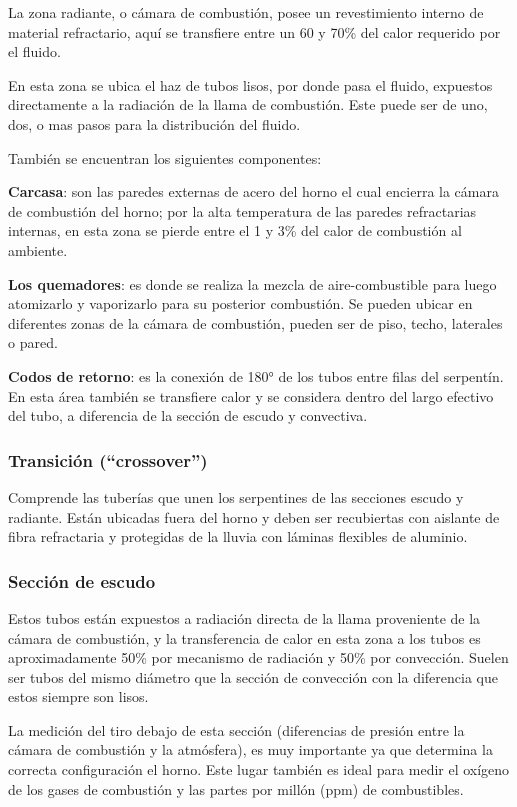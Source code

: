 \par La zona radiante, o cámara de combustión, posee un revestimiento interno de material refractario, aquí se transfiere entre un 60 y 70\% del calor requerido por el fluido.
\par En esta zona se ubica el haz de tubos lisos, por donde pasa el fluido, expuestos directamente a la radiación de la llama de combustión. Este puede ser de uno, dos, o mas pasos para la distribución del fluido.
\par También se encuentran los siguientes componentes:
\par \textbf{Carcasa}: son las paredes externas de acero del horno el cual encierra la cámara de combustión del horno; por la alta temperatura de las paredes refractarias internas, en esta zona se pierde entre el 1 y 3\% del calor de combustión al ambiente.
\par \textbf{Los quemadores}: es donde se realiza la mezcla de aire-combustible para luego atomizarlo y vaporizarlo para su posterior combustión. Se pueden ubicar en diferentes zonas de la cámara de combustión, pueden ser de piso, techo, laterales o pared.
\par \textbf{Codos de retorno}: es la conexión de 180° de los tubos entre filas del serpentín. En esta área también se transfiere calor y se considera dentro del largo efectivo del tubo, a diferencia de la sección de escudo y convectiva.

\subsubsection{Transición (``crossover'')}
\par Comprende las tuberías que unen los serpentines de las secciones escudo y radiante. Están ubicadas fuera del horno y deben ser recubiertas con aislante de fibra refractaria y protegidas de la lluvia con láminas flexibles de aluminio.

\subsubsection{Sección de escudo}
\par Estos tubos están expuestos a radiación directa de la llama proveniente de la cámara de combustión, y la transferencia de calor en esta zona a los tubos es aproximadamente 50\% por mecanismo de radiación y 50\% por convección. Suelen ser tubos del mismo diámetro que la sección de convección con la diferencia que estos siempre son lisos.
\par La medición del tiro debajo de esta sección (diferencias de presión entre la cámara de combustión y la atmósfera), es muy importante ya que determina la correcta configuración el horno. Este lugar también es ideal para medir el oxígeno de los gases de combustión y las partes por millón (ppm) de combustibles.

